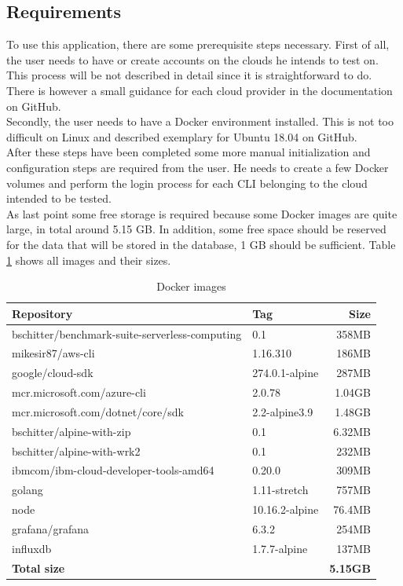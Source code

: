 \subsection{Requirements}
To use this application, there are some prerequisite steps necessary. First of all, the user needs to have or create accounts on the clouds he intends to test on. This process will be not described in detail since it is straightforward to do. There is however a small guidance for each cloud provider in the documentation on GitHub.\\
Secondly, the user needs to have a Docker environment installed. This is not too difficult on Linux and described exemplary for Ubuntu 18.04 on GitHub.\\
After these steps have been completed some more manual initialization and configuration steps are required from the user. He needs to create a few Docker volumes and perform the login process for each \gls{CLI} belonging to the cloud intended to be tested.\\
As last point some free storage is required because some Docker images are quite large, in total around 5.15 GB. In addition, some free space should be reserved for the data that will be stored in the database, 1 GB should be sufficient. Table \ref{table:images} shows all images and their sizes.

\begin{table}[htp]
\centering
\captionsetup[table]{justification=centering, labelfont=bf}
\begin{tabular}{|l|l|r|}\hline
\textbf{Repository} & \textbf{Tag} & \textbf{Size} \\ \hline
bschitter/benchmark-suite-serverless-computing	&	0.1	&	358MB	\\ \hline
mikesir87/aws-cli	&	1.16.310	&	186MB	\\ \hline
google/cloud-sdk	&	274.0.1-alpine	&	287MB	\\ \hline
mcr.microsoft.com/azure-cli	&	2.0.78	&	1.04GB	\\ \hline
mcr.microsoft.com/dotnet/core/sdk	&	2.2-alpine3.9	&	1.48GB	\\ \hline
bschitter/alpine-with-zip	&	0.1	&	6.32MB	\\ \hline
bschitter/alpine-with-wrk2	&	0.1	&	232MB	\\ \hline
ibmcom/ibm-cloud-developer-tools-amd64	&	0.20.0	&	309MB	\\ \hline
golang	&	1.11-stretch	&	757MB	\\ \hline
node	&	10.16.2-alpine	&	76.4MB	\\ \hline
grafana/grafana	&	6.3.2	&	254MB	\\ \hline
influxdb	&	1.7.7-alpine	&	137MB	\\ \hline
\textbf{Total size} & & \textbf{5.15GB}\\ \hline
\end{tabular}
\caption[Docker images]{Docker images}
\label{table:images}
\end{table}

